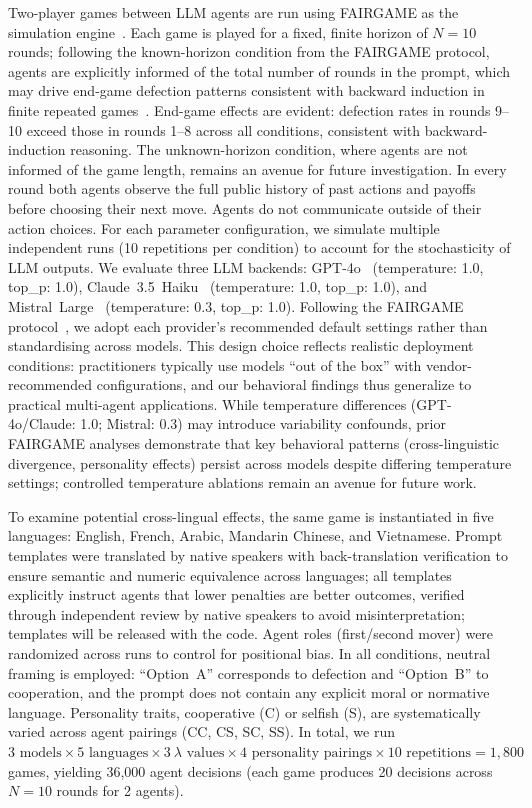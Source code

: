 \documentclass{article}
\begin{document}
Two-player games between LLM agents are run using FAIRGAME as the simulation engine~\cite{buscemi2025fairgame}. Each game is played for a fixed, finite horizon of $N = 10$ rounds; following the known-horizon condition from the FAIRGAME protocol, agents are explicitly informed of the total number of rounds in the prompt, which may drive end-game defection patterns consistent with backward induction in finite repeated games~\cite{sigmund:2010bo}. End-game effects are evident: defection rates in rounds 9--10 exceed those in rounds 1--8 across all conditions, consistent with backward-induction reasoning. The unknown-horizon condition, where agents are not informed of the game length, remains an avenue for future investigation. In every round both agents observe the full public history of past actions and payoffs before choosing their next move. Agents do not communicate outside of their action choices. For each parameter configuration, we simulate multiple independent runs (10 repetitions per condition) to account for the stochasticity of LLM outputs. We evaluate three LLM backends: GPT-4o~\cite{gpt4o} (temperature: 1.0, top\_p: 1.0), Claude~3.5~Haiku~\cite{claude3} (temperature: 1.0, top\_p: 1.0), and Mistral~Large~\cite{mistral} (temperature: 0.3, top\_p: 1.0). Following the FAIRGAME protocol~\cite{buscemi2025fairgame}, we adopt each provider's recommended default settings rather than standardising across models. This design choice reflects realistic deployment conditions: practitioners typically use models ``out of the box'' with vendor-recommended configurations, and our behavioral findings thus generalize to practical multi-agent applications. While temperature differences (GPT-4o/Claude: 1.0; Mistral: 0.3) may introduce variability confounds, prior FAIRGAME analyses demonstrate that key behavioral patterns (cross-linguistic divergence, personality effects) persist across models despite differing temperature settings; controlled temperature ablations remain an avenue for future work.





To examine potential cross-lingual effects, the same game is instantiated in five languages: English, French, Arabic, Mandarin Chinese, and Vietnamese. Prompt templates were translated by native speakers with back-translation verification to ensure semantic and numeric equivalence across languages; all templates explicitly instruct agents that lower penalties are better outcomes, verified through independent review by native speakers to avoid misinterpretation; templates will be released with the code. Agent roles (first/second mover) were randomized across runs to control for positional bias. In all conditions, neutral framing is employed: ``Option~A'' corresponds to defection and ``Option~B'' to cooperation, and the prompt does not contain any explicit moral or normative language. Personality traits, cooperative (C) or selfish (S), are systematically varied across agent pairings (CC, CS, SC, SS). In total, we run $3 \text{ models} \times 5 \text{ languages} \times 3~\lambda \text{ values} \times 4 \text{ personality pairings} \times 10 \text{ repetitions} = 1,800$ games, yielding 36,000 agent decisions (each game produces 20 decisions across $N{=}10$ rounds for 2 agents).
\end{document}

